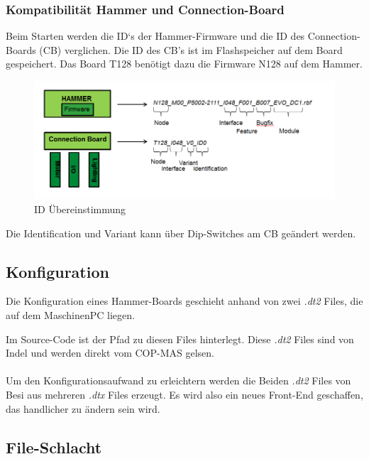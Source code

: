 		\subsubsection{Kompatibilität Hammer und Connection-Board}
			Beim Starten werden die ID`s der Hammer-Firmware und die ID des Connection-Boards (CB) verglichen. Die ID des CB's ist im Flashspeicher auf dem Board gespeichert. Das Board T128 benötigt dazu die Firmware N128 auf dem Hammer. 
			\begin{figure}[h!]
				\centering
				\includegraphics[width=0.8\linewidth]{./pics/ccp/connectionboard.png}
				\caption{ID Übereinstimmung}
			\end{figure}
			Die Identification und Variant kann über Dip-Switches am CB geändert werden. 
		
	\subsection{Konfiguration}
		Die Konfiguration eines Hammer-Boards geschieht anhand von zwei \textit{.dt2} Files, die auf dem MaschinenPC liegen.
		
		Im Source-Code ist der Pfad zu diesen Files hinterlegt. Diese \textit{.dt2} Files sind von Indel und werden direkt vom COP-MAS gelsen.
		\\\\
		Um den Konfigurationsaufwand zu erleichtern werden die Beiden \textit{.dt2} Files von Besi aus mehreren \textit{.dtx} Files erzeugt. Es wird also ein neues Front-End geschaffen, das handlicher zu ändern sein wird.
		
	\subsection{File-Schlacht}

